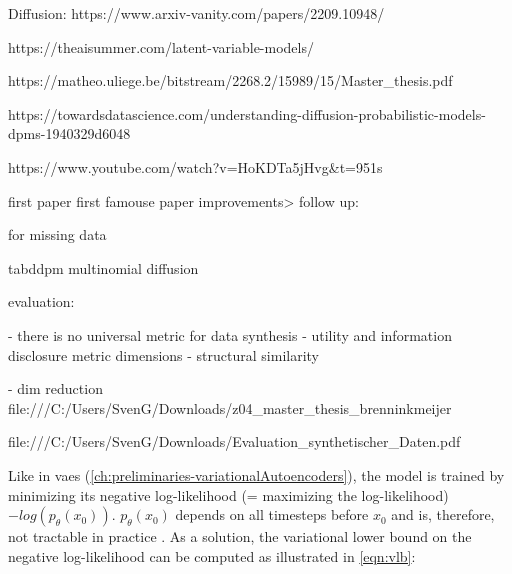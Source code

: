Diffusion:
https://www.arxiv-vanity.com/papers/2209.10948/

https://theaisummer.com/latent-variable-models/

https://matheo.uliege.be/bitstream/2268.2/15989/15/Master_thesis.pdf

https://towardsdatascience.com/understanding-diffusion-probabilistic-models-dpms-1940329d6048 

https://www.youtube.com/watch?v=HoKDTa5jHvg&t=951s


first paper \cite{sohl-dickstein2015DeepUnsupervisedLearning}
first famouse paper \cite{ho2020DenoisingDiffusionProbabilistic}
improvements> \cite{nichol2021ImprovedDenoisingDiffusion}
follow up: \cite{dhariwal2021DiffusionModelsBeat}

\cite{ho2022ClassifierFreeDiffusionGuidance}

\cite{rombach2022HighResolutionImageSynthesis}



\cite{zheng2022DiffusionModelsMissing} for missing data

\cite{kotelnikov2022TabDDPMModellingTabular} tabddpm
\cite{hoogeboom2021ArgmaxFlowsMultinomial} multinomial diffusion


evaluation:

- there is no universal metric for data synthesis \cite{hernandez2022SyntheticDataGeneration}
- utility and information disclosure metric dimensions \cite{goncalves2020GenerationEvaluationSynthetic}
- structural similarity \cite{elemam2020SevenWaysEvaluate}

- dim reduction
file:///C:/Users/SvenG/Downloads/z04_master_thesis_brenninkmeijer%

file:///C:/Users/SvenG/Downloads/Evaluation_synthetischer_Daten.pdf




Like in \glspl{vae} (\autoref{ch:preliminaries-variationalAutoencoders}), the model is trained by minimizing its negative log-likelihood (= maximizing the log-likelihood) $-log(p_\theta(x_0))$.
$p_\theta(x_0)$ depends on all timesteps before $x_0$ and is, therefore, not tractable in practice \cite{zbinden2022ImplementingExperimentingDiffusion}.
As a solution, the variational lower bound on the negative log-likelihood can be computed as illustrated in \autoref{eqn:vlb}: %

